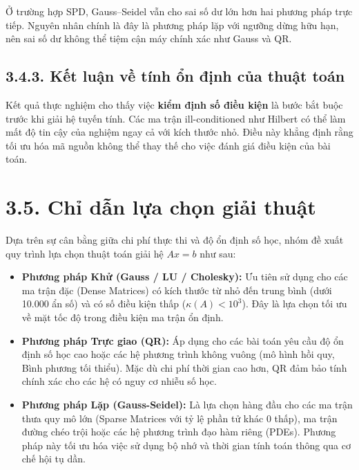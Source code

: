 Ở trường hợp SPD, Gauss--Seidel vẫn cho sai số dư lớn hơn hai phương pháp trực tiếp. Nguyên nhân chính là đây là phương pháp lặp với ngưỡng dừng hữu hạn, nên sai số dư không thể tiệm cận máy chính xác như Gauss và QR.

\subsection*{3.4.3. Kết luận về tính ổn định của thuật toán}
Kết quả thực nghiệm cho thấy việc \textbf{kiểm định số điều kiện} là bước bắt buộc trước khi giải hệ tuyến tính. Các ma trận ill-conditioned như Hilbert có thể làm mất độ tin cậy của nghiệm ngay cả với kích thước nhỏ. Điều này khẳng định rằng tối ưu hóa mã nguồn không thể thay thế cho việc đánh giá điều kiện của bài toán.

\section*{3.5. Chỉ dẫn lựa chọn giải thuật}
Dựa trên sự cân bằng giữa chi phí thực thi và độ ổn định số học, nhóm đề xuất quy trình lựa chọn thuật toán giải hệ $Ax = b$ như sau:

\begin{itemize}
    \item \textbf{Phương pháp Khử (Gauss / LU / Cholesky):} Ưu tiên sử dụng cho các ma trận đặc (Dense Matrices) có kích thước từ nhỏ đến trung bình (dưới 10.000 ẩn số) và có số điều kiện thấp ($\kappa(A) < 10^3$). Đây là lựa chọn tối ưu về mặt tốc độ trong điều kiện ma trận ổn định.
    \item \textbf{Phương pháp Trực giao (QR):} Áp dụng cho các bài toán yêu cầu độ ổn định số học cao hoặc các hệ phương trình không vuông (mô hình hồi quy, Bình phương tối thiểu). Mặc dù chi phí thời gian cao hơn, QR đảm bảo tính chính xác cho các hệ có nguy cơ nhiễu số học.
    \item \textbf{Phương pháp Lặp (Gauss-Seidel):} Là lựa chọn hàng đầu cho các ma trận thưa quy mô lớn (Sparse Matrices với tỷ lệ phần tử khác 0 thấp), ma trận đường chéo trội hoặc các hệ phương trình đạo hàm riêng (PDEs). Phương pháp này tối ưu hóa việc sử dụng bộ nhớ và thời gian tính toán thông qua cơ chế hội tụ dần.
\end{itemize}
